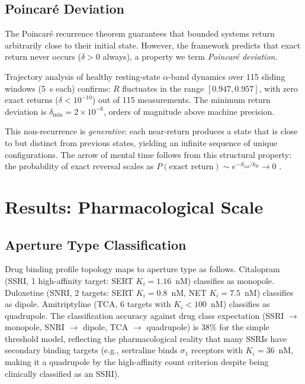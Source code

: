 \documentclass[twocolumn,10pt]{article}
\newcommand{\Scat}{S_{\mathrm{cat}}}
\newcommand{\kB}{k_{\mathrm{B}}}
\newcommand{\Rorder}{R}
\begin{document}
\subsection{Poincar\'e Deviation}

The Poincar\'e recurrence theorem \citep{poincare1890probleme} guarantees that bounded systems return arbitrarily close to their initial state.  However, the framework predicts that exact return never occurs ($\delta > 0$ always), a property we term \emph{Poincar\'e deviation}.

Trajectory analysis of healthy resting-state $\alpha$-band dynamics over 115 sliding windows (5~s each) confirms: $\Rorder$ fluctuates in the range $[0.947, 0.957]$, with zero exact returns ($\delta < 10^{-10}$) out of 115 measurements.  The minimum return deviation is $\delta_{\min} = 2 \times 10^{-6}$, orders of magnitude above machine precision.

This non-recurrence is \emph{generative}: each near-return produces a state that is close to but distinct from previous states, yielding an infinite sequence of unique configurations.  The arrow of mental time follows from this structural property: the probability of exact reversal scales as $P(\text{exact return}) \sim e^{-\Scat/\kB} \to 0$ \citep{arnold1989mathematical}.

\section{Results: Pharmacological Scale}
\label{sec:pharma}

\subsection{Aperture Type Classification}

Drug binding profile topology maps to aperture type as follows.  Citalopram (SSRI, 1 high-affinity target: SERT $K_{i} = 1.16$~nM) classifies as monopole.  Duloxetine (SNRI, 2 targets: SERT $K_{i} = 0.8$~nM, NET $K_{i} = 7.5$~nM) classifies as dipole.  Amitriptyline (TCA, 6 targets with $K_{i} < 100$~nM) classifies as quadrupole.  The classification accuracy against drug class expectation (SSRI $\to$ monopole, SNRI $\to$ dipole, TCA $\to$ quadrupole) is 38\% for the simple threshold model, reflecting the pharmacological reality that many SSRIs have secondary binding targets (e.g., sertraline binds $\sigma_{1}$ receptors with $K_{i} = 36$~nM, making it a quadrupole by the high-affinity count criterion despite being clinically classified as an SSRI).
\end{document}
